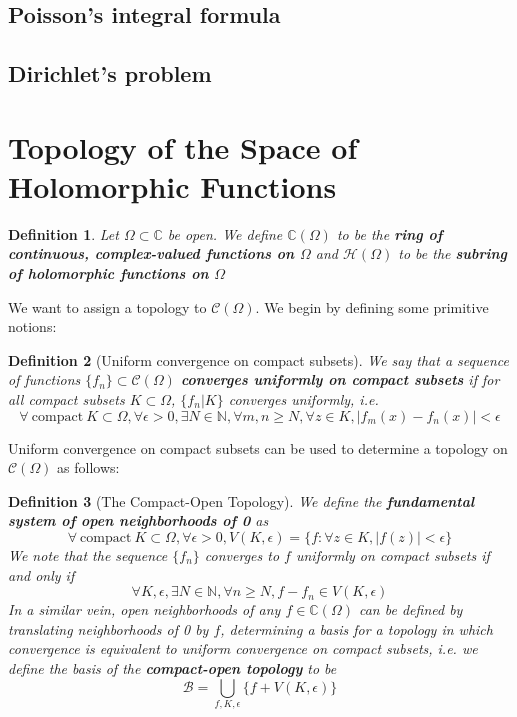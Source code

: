 \documentclass{article}
\newcommand{\mbb}[1]{\mathbb{#1}}
\newcommand{\mc}[1]{\mathcal{#1}}
\newtheorem{definition}{Definition}
\begin{document}
\subsection{Poisson's integral formula}

\subsection{Dirichlet's problem}

\section{Topology of the Space of Holomorphic Functions}

\begin{definition}
Let \(\Omega \subset \mbb{C}\) be open. We define \(\mbb{C}(\Omega)\) to be the \textbf{ring of continuous, complex-valued functions on \(\Omega\)} and \(\mc{H}(\Omega)\) to be the \textbf{subring of holomorphic functions on \(\Omega\)}
\end{definition}
We want to assign a topology to \(\mc{C}(\Omega)\). We begin by defining some primitive notions:
\begin{definition}[Uniform convergence on compact subsets]
We say that a sequence of functions \(\{f_n\} \subset \mc{C}(\Omega)\) \textbf{converges uniformly on compact subsets} if for all compact subsets \(K \subset \Omega\), \(\{f_n | K\}\) converges uniformly, i.e.
\[\forall \ \text{compact} \ K \subset \Omega, \forall \epsilon > 0, \exists N \in \mbb{N}, \forall m, n \geq N, \forall z \in K, |f_m(x) - f_n(x)| < \epsilon\]
\end{definition}
Uniform convergence on compact subsets can be used to determine a topology on \(\mc{C}(\Omega)\) as follows:
\begin{definition}[The Compact-Open Topology]
We define the \textbf{fundamental system of open neighborhoods of 0} as
\[\forall \ \text{compact} \ K \subset \Omega, \forall \epsilon > 0, V(K, \epsilon) = \{f: \forall z \in K, |f(z)| < \epsilon\}\]
We note that the sequence \(\{f_n\}\) converges to \(f\) uniformly on compact subsets if and only if
\[\forall K, \epsilon, \exists N \in \mbb{N}, \forall n \geq N, f - f_n \in V(K, \epsilon)\]
In a similar vein, open neighborhoods of any \(f \in \mbb{C}(\Omega)\) can be defined by translating neighborhoods of 0 by \(f\), determining a basis for a topology in which convergence is equivalent to uniform convergence on compact subsets, i.e. we define the basis of the \textbf{compact-open topology} to be
\[\mc{B} = \bigcup_{f, K, \epsilon}\{f + V(K, \epsilon)\}\]
\end{definition}
\end{document}
